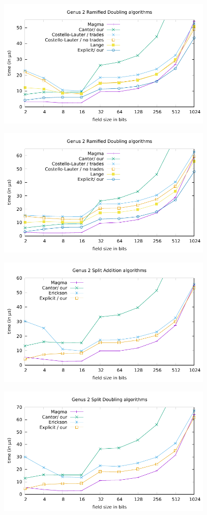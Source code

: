 \centerline{\includegraphics[width=0.775\textwidth]{genus2/g2_G2_RAM_ADD.pdf}}
\centerline{\includegraphics[width=0.775\textwidth]{genus2/g2_G2_RAM_DBL.pdf}}
\centerline{\includegraphics[width=0.775\textwidth]{genus2/g2_G3_SPL_ADD.pdf}}
\centerline{\includegraphics[width=0.775\textwidth]{genus2/g2_G3_SPL_DBL.pdf}}
